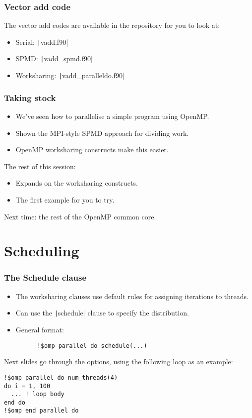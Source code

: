 \documentclass{beamer}
\begin{document}
\begin{frame}
\frametitle{Vector add code}
The vector add codes are available in the repository for you to look at:
\begin{itemize}
  \item Serial: \texttt|vadd.f90|
  \item SPMD: \texttt|vadd_spmd.f90|
  \item Worksharing: \texttt|vadd_paralleldo.f90|
\end{itemize}
\end{frame}

\begin{frame}
\frametitle{Taking stock}
\begin{itemize}
  \item We've seen how to parallelise a simple program using OpenMP.
  \item Shown the MPI-style SPMD approach for dividing work.
  \item OpenMP worksharing constructs make this easier.
\end{itemize}

The rest of this session:
\begin{itemize}
  \item Expands on the worksharing constructs.
  \item The first example for you to try.
\end{itemize}

Next time: the rest of the OpenMP common core.
\end{frame}

\section{Scheduling}
\begin{frame}[fragile]
\frametitle{The Schedule clause}
\begin{itemize}
  \item The worksharing clauses use default rules for assigning iterations to threads.
  \item Can use the \texttt|schedule| clause to specify the distribution.
  \item General format:
    \begin{verbatim}
      !$omp parallel do schedule(...)
    \end{verbatim}
\end{itemize}
Next slides go through the options, using the following loop as an example:
\begin{verbatim}
!$omp parallel do num_threads(4)
do i = 1, 100
  ... ! loop body
end do
!$omp end parallel do
\end{verbatim}

\end{frame}
\end{document}
